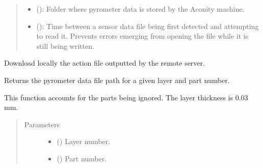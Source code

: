 \documentclass[letterpaper,10pt,english,openany,oneside]{sphinxmanual}
\begin{document}
\begin{fulllineitems}
\begin{quote}
\begin{description}
\begin{itemize}
\begin{itemize}
\item {} 
 (): Folder where pyrometer data is stored by the Aconity machine.

\item {} 
 (): Time between a sensor data file being first detected and attempting to read it. Prevents errors emerging from opening the file while it is still being written.

\end{itemize}


\end{itemize}

\end{description}\end{quote}

\begin{fulllineitems}
\label{\detokenize{_modules/machine:machine.Machine.getActions}}
Download locally the action file outputted by the remote server.

\end{fulllineitems}


\begin{fulllineitems}
\label{\detokenize{_modules/machine:machine.Machine.getFileName}}
Returns the pyrometer data file path for a given layer and part number.

This function accounts for the parts being ignored. The layer thickness
is 0.03 mm.
\begin{quote}\begin{description}
\item[{Parameters}] \leavevmode\begin{itemize}
\item {} 
 () \textendash{} Layer number.

\item {} 
 () \textendash{} Part number.


\end{itemize}
\end{description}
\end{quote}
\end{fulllineitems}
\end{fulllineitems}
\end{document}
